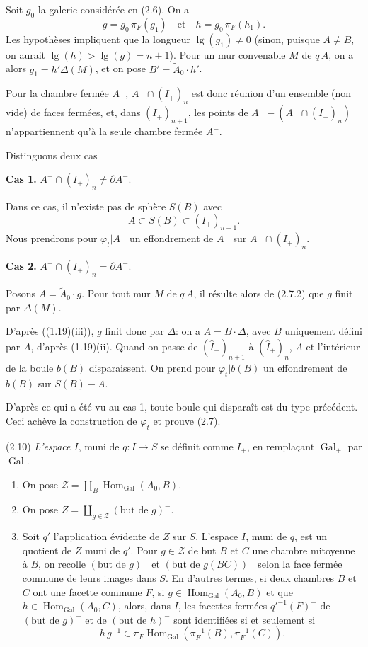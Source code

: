 \documentclass[12pt]{article}
\theoremstyle{remark}
\DeclareMathOperator{\Gal}{Gal}
\DeclareMathOperator{\Hom}{Hom}
\begin{document}
Soit $g_0$ la galerie considérée en (2.6). On a
\[g = g_0 \, \pi_F(g_1) \quad \text{et} \quad h = g_0 \, \pi_F(h_1).\]
Les hypothèses impliquent que la longueur $\lg(g_1) \neq 0$ (sinon, puisque $A \neq B$, on aurait $\lg(h) > \lg(g) = n+1$). Pour un mur convenable $M$ de $q \, A$, on a alors $g_1 = h' \Delta(M)$, et on pose $B' = \tilde{A}_0 \cdot h'$.

Pour la chambre fermée $A^-$, $A^- \cap (I_+)_n$ est donc réunion d'un ensemble (non vide) de faces fermées, et, dans $(I_+)_{n+1}$, les points de $A^- - (A^- \cap (I_+)_n)$ n'appartiennent qu'à la seule chambre fermée $A^-$.

Distinguons deux cas

\textbf{Cas 1.} $A^- \cap (I_+)_n \neq \partial A^-$.

Dans ce cas, il n'existe pas de sphère $S(B)$ avec
\[A \subset S(B) \subset (I_+)_{n+1}.\]
Nous prendrons pour $\varphi_t|A^-$ un effondrement de $A^-$ sur $A^- \cap (I_+)_n$.

\textbf{Cas 2.} $A^- \cap (I_+)_n = \partial A^-$.

Posons $A = \tilde{A}_0 \cdot g$. Pour tout mur $M$ de $q \, A$, il résulte alors de (2.7.2) que $g$ finit par $\Delta(M)$.

D'après ((1.19)(iii)), $g$ finit donc par $\Delta$: on a $A = B \cdot \Delta$, avec $B$ uniquement défini par $A$, d'après (1.19)(ii). Quand on passe de $(\hat{I}_+)_{n+1}$ à $(\hat{I}_+)_n$, $A$ et l'intérieur de la boule $b(B)$ disparaissent. On prend pour $\varphi_t|b(B)$ un effondrement de $b(B)$ sur $S(B) - A$.

D'après ce qui a été vu au cas 1, toute boule qui disparaît est du type précédent. Ceci achève la construction de $\varphi_t$ et prouve (2.7).

(2.10) \emph{L'espace $I$}, muni de $q \colon I \to S$ se définit comme $I_+$, en remplaçant $\Gal_+$ par $\Gal$.
\begin{enumerate}
\item[a)] On pose $\mathscr{Z} = \coprod_B \Hom_{\Gal}(A_0, B)$.
\item[b)] On pose $Z = \coprod_{g \in \mathscr{Z}} (\text{but de } g)^-$.
\item[c)] Soit $q'$ l'application évidente de $Z$ sur $S$. L'espace $I$, muni de $q$, est un quotient de $Z$ muni de $q'$. Pour $g \in \mathscr{Z}$ de but $B$ et $C$ une chambre mitoyenne à $B$, on recolle $(\text{but de } g)^-$ et $(\text{but de } g(BC))^-$ selon la face fermée commune de leurs images dans $S$. En d'autres termes, si deux chambres $B$ et $C$ ont une facette commune $F$, si $g \in \Hom_{\Gal}(A_0, B)$ et que $h \in \Hom_{\Gal}(A_0, C)$, alors, dans $I$, les facettes fermées $q'^{-1}(F)^-$ de $(\text{but de } g)^-$ et de $(\text{but de } h)^-$ sont identifiées si et seulement si
\[h \, g^{-1} \in \pi_F \Hom_{\Gal}(\pi_F^{-1}(B), \pi_F^{-1}(C)).\]
\end{enumerate}
\end{document}
